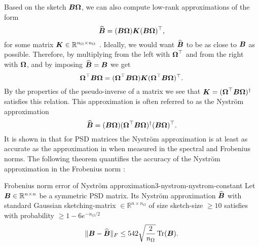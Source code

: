 Based on the sketch $\boldsymbol{B}\boldsymbol{\Omega}$, we can also compute low-rank approximations
of the form
\begin{equation}
    \widehat{\boldsymbol{B}} = (\boldsymbol{B} \boldsymbol{\Omega}) \boldsymbol{K} (\boldsymbol{B} \boldsymbol{\Omega})^{\top},
    \label{equ:3-nystrom-nystrom-general}
\end{equation}
for some matrix $\boldsymbol{K} \in \mathbb{R}^{n_{\Omega} \times n_{\Omega}}$ \cite[section~3.1]{lin2017randomized}.
Ideally, we would want $\widehat{\boldsymbol{B}}$ to be as close to $\boldsymbol{B}$ as possible. Therefore, by multiplying 
from the left with $\boldsymbol{\Omega}^{\top}$ and from the right with $\boldsymbol{\Omega}$,
and by imposing $\widehat{\boldsymbol{B}} = \boldsymbol{B}$ we get
\begin{equation}
    \boldsymbol{\Omega}^{\top} \boldsymbol{B} \boldsymbol{\Omega} = (\boldsymbol{\Omega}^{\top} \boldsymbol{B} \boldsymbol{\Omega}) \boldsymbol{K} (\boldsymbol{\Omega}^{\top} \boldsymbol{B} \boldsymbol{\Omega})^{\top}.
    \label{equ:3-nystrom-nystrom-unknown}
\end{equation}
By the properties of the pseudo-inverse of a matrix we see that
$\boldsymbol{K} = (\boldsymbol{\Omega}^{\top} \boldsymbol{B} \boldsymbol{\Omega})^{\dagger}$ satisfies this
relation.
This approximation is often referred to as the Nystr\"om approximation \cite{gittens2013nystrom}
\begin{equation}
    \widehat{\boldsymbol{B}} = (\boldsymbol{B} \boldsymbol{\Omega}) (\boldsymbol{\Omega}^{\top} \boldsymbol{B} \boldsymbol{\Omega})^{\dagger} (\boldsymbol{B} \boldsymbol{\Omega})^{\top}.
    \label{equ:3-nystrom-nystrom}
\end{equation}
It is shown in \cite[lemma~5.2]{tropp2023randomized} that for \gls{PSD} matrices
the Nystr\"om approximation is at least as accurate as the approximation in
 when measured in the spectral
and Frobenius norms. The following theorem quantifies the accuracy of the
Nystr\"om approximation in the Frobenius norm \cite[lemma~3.2]{persson2022hutch}:

\begin{theorem}{Frobenius norm error of Nystr\"om approximation}{3-nystrom-nystrom-constant}
    Let $\boldsymbol{B} \in \mathbb{R}^{n \times n}$ be a symmetric \gls{PSD} matrix. Its Nystr\"om approximation
    $\widehat{\boldsymbol{B}}$  with standard Gaussian
    \gls{sketching-matrix} $\in \mathbb{R}^{n \times n_{\Omega}}$ of size
    \gls{sketch-size} $\geq 10$
    satisfies with probability $\geq 1-6e^{-n_{\Omega}/2}$
    \begin{equation}
        \lVert \boldsymbol{B} - \widehat{\boldsymbol{B}} \rVert _F \leq 542\sqrt{\frac{2}{n_{\Omega}}} \operatorname{Tr}(\boldsymbol{B}).
    \end{equation}
\end{theorem}

